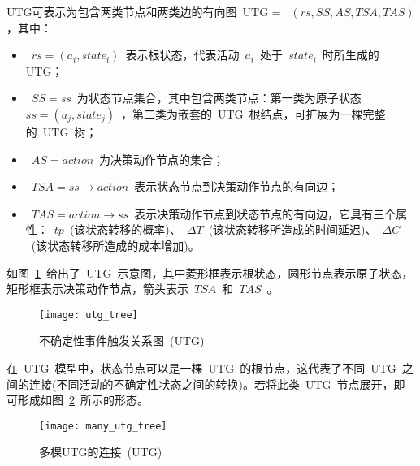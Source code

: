 UTG可表示为包含两类节点和两类边的有向图~UTG = ~$(rs, SS, AS, TSA, TAS)$，其中：
\begin{itemize}
    \item ~$rs=(a_i, state_i)$~表示根状态，代表活动~$a_i$~处于~$state_i$~时所生成的UTG；
    \item ~$SS={ss}$~为状态节点集合，其中包含两类节点：第一类为原子状态~$ss=(a_j, state_j)$~，第二类为嵌套的~UTG~根结点，可扩展为一棵完整的~UTG~树；
    \item ~$AS={action}$~为决策动作节点的集合；
    \item ~$TSA=ss \to action$~表示状态节点到决策动作节点的有向边；
    \item ~$TAS=action \to ss$~表示决策动作节点到状态节点的有向边，它具有三个属性：~$tp$~(该状态转移的概率)、~$\Delta T$~(该状态转移所造成的时间延迟)、~$\Delta C$~(该状态转移所造成的成本增加)。
\end{itemize}

如图~\ref{figure:utg_tree}~给出了~UTG~示意图，其中菱形框表示根状态，圆形节点表示原子状态，矩形框表示决策动作节点，箭头表示~$TSA$~和~$TAS$~。

\begin{figure}[htbp]
    \centering
    \texttt{[image: utg\_tree]}
    \caption{不确定性事件触发关系图~(UTG)~}\label{figure:utg_tree}
    \vspace{-1em}
\end{figure}

在~UTG~模型中，状态节点可以是一棵~UTG~的根节点，这代表了不同~UTG~之间的连接(不同活动的不确定性状态之间的转换)。若将此类~UTG~节点展开，即可形成如图~\ref{figure:many_utg_tree}~所示的形态。

\begin{figure}[htbp]
    \centering
    \texttt{[image: many\_utg\_tree]}
    \caption{多棵UTG的连接~(UTG)~}\label{figure:many_utg_tree}
    \vspace{-1em}
\end{figure}

%

